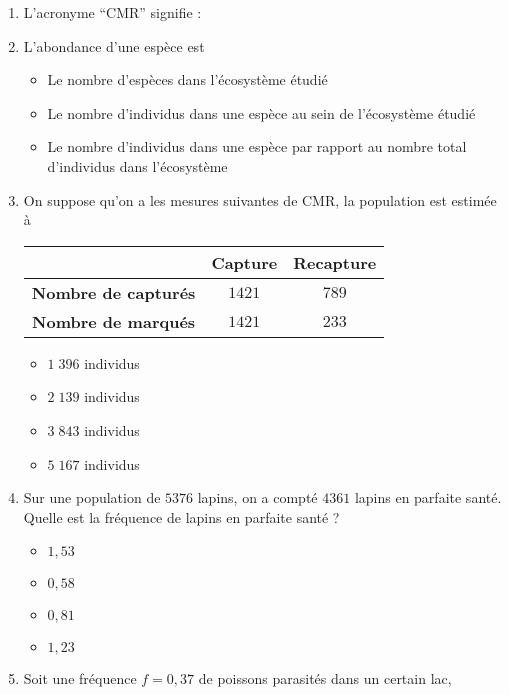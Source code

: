\documentclass[11pt]{article}
\begin{document}
\begin{enumerate}
  \item L'acronyme ``CMR'' signifie :
  \item L'abondance d'une espèce est
    \begin{itemize}[label=$\Box$]
      \item Le nombre d'espèces dans l'écosystème étudié
      \item Le nombre d'individus dans une espèce au sein de l'écosystème étudié
      \item {\small Le nombre d'individus dans une espèce par rapport au nombre total
        d'individus dans l'écosystème}
    \end{itemize}
  \item On suppose qu'on a les mesures suivantes de CMR, la population est
    estimée à
\begin{center}
\begin{tabular}{ccc}
  \toprule
  & \textbf{Capture} & \textbf{Recapture} \\ \midrule
  \textbf{Nombre de capturés} & $1421$ & $789$ \\
  \textbf{Nombre de marqués} & $1421$ & $233$ \\ \bottomrule
 \end{tabular}
\end{center}
\begin{multicols}{2}
\begin{itemize}[label=$\Box$]
  \item $1\;396$ individus
  \item $2\;139$ individus
  \item $3\;843$ individus
  \item $5\;167$ individus
\end{itemize}
\end{multicols}
\item Sur une population de $5376$ lapins, on a compté $4361$ lapins en parfaite
  santé. Quelle est la fréquence de lapins en parfaite santé ?
  \begin{multicols}{4}
  \begin{itemize}[label=$\Box$]
    \item $1,53$
    \item $0,58$
    \item $0,81$
    \item $1,23$
  \end{itemize}
  \end{multicols}
\item Soit une fréquence $f=0,37$ de poissons parasités dans un certain lac,

\end{enumerate}
\end{document}

